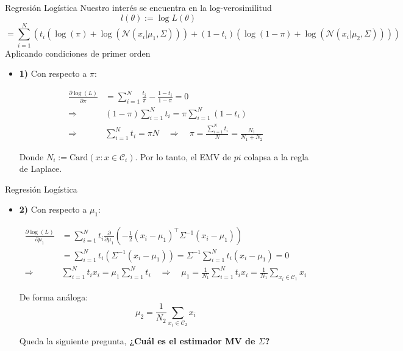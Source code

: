 \documentclass[9pt]{beamer}
\begin{document}
\begin{frame}{Regresión Logística}
Nuestro interés se encuentra en la log-verosimilitud 
\begin{equation*}
  l(\theta) := \log L(\theta) 
\end{equation*} 
\begin{equation*}
= \sum_{i=1}^{N}\left(t_i(\log(\pi)+\log(\mathcal{N}(x_i|\mu_1,\Sigma)))+(1-t_i)(\log(1-\pi)+\log(\mathcal{N}(x_i|\mu_2,\Sigma)))\right)
\end{equation*} \pause
Aplicando condiciones de primer orden

\begin{itemize}
  
\item \textbf{1)} Con respecto a $\pi$:
  
  \begin{align}
  \frac{\partial\log(L)}{\partial\pi} &= \sum_{i=1}^N \frac{t_i}{\pi}-\frac{1-t_i}{1-\pi}=0\nonumber\\
  \Rightarrow \quad & (1-\pi)\sum_{i=1}^Nt_i = \pi\sum_{i=1}^N(1-t_i)\nonumber\\
  \Rightarrow \quad & \sum_{i=1}^Nt_i=\pi N \quad\Rightarrow\quad \pi = \frac{\sum_{i=1}^Nt_i}{N} = \frac{N_1}{N_1+N_2} \label{eq:log_reg_pi}
  \end{align}
  
  Donde $N_i:=\text{Card}(x:x\in\mathcal{C}_i)$. Por lo tanto, el EMV de $pi$ colapsa a la regla de Laplace.

\end{itemize}
\end{frame}

\begin{frame}{Regresión Logística}
\begin{itemize}
\item \textbf{2)} Con respecto a $\mu_1$:
  
  \begin{align*}
  \frac{\partial\log(L)}{\partial\mu_1} &= \sum_{i=1}^N t_i
  \frac{\partial}{\partial \mu_1}(-\frac{1}{2}(x_i-\mu_1)^\top \Sigma^{-1}(x_i-\mu_1))\nonumber\\
  &= \sum_{i=1}^N t_i(\Sigma^{-1}(x_i-\mu_1)) =
  \Sigma^{-1}\sum_{i=1}^N t_i(x_i-\mu_1) = 0\nonumber\\
  \Rightarrow\quad & \sum_{i=1}^Nt_ix_i= \mu_1\sum_{i=1}^N t_i
  \quad\Rightarrow\quad \mu_1  = \frac{1}{N_1}\sum_{i=1}^Nt_ix_i = \frac{1}{N_1}\sum_{x_i\in \mathcal{C}_1}x_i \label{eq:log_reg_mu1}
  \end{align*}
  
  De forma análoga:
  \begin{equation*}
  \mu_2 = \frac{1}{N_2}\sum_{x_i\in \mathcal{C}_2}x_i \label{eq:log_reg_mu2}
  \end{equation*} \pause

  Queda la siguiente pregunta, \textbf{¿Cuál es el estimador MV de $\Sigma$?}
  
\end{itemize}

\end{frame}
\end{document}
